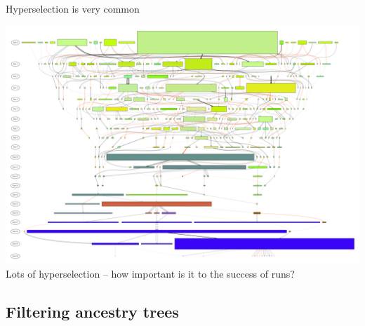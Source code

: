 \documentclass{beamer}
\begin{document}
\begin{frame}{Hyperselection is very common}
\begin{center}
\includegraphics[width=0.8 \textwidth]{Illustrations/run0_RBM_color_full_30000.pdf} \\
Lots of hyperselection -- how important is it to the success of runs?~\cite{Helmuth:2016:GECCO}
\end{center}
\end{frame}

\subsection{Filtering ancestry trees}
\end{document}
